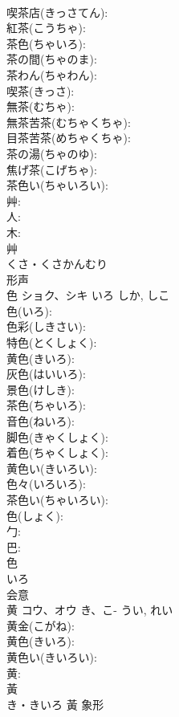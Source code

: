 \documentclass[8pt]{extreport}
\begin{document}
\begin{CJK}{UTF8}{min}
\\	喫茶店(きっさてん): 
\\	紅茶(こうちゃ): 
\\	茶色(ちゃいろ): 
\\	茶の間(ちゃのま): 
\\	茶わん(ちゃわん): 
\\	喫茶(きっさ): 
\\	無茶(むちゃ): 
\\	無茶苦茶(むちゃくちゃ): 
\\	目茶苦茶(めちゃくちゃ): 
\\	茶の湯(ちゃのゆ): 
\\	焦げ茶(こげちゃ): 
\\	茶色い(ちゃいろい): 
\\	艸: 
\\	人: 
\\	木: 
\\	艸	
\\	くさ・くさかんむり	
\\	形声 
\\	色	ショク、シキ	いろ	しか, しこ	
\\	色(いろ): 
\\	色彩(しきさい): 
\\	特色(とくしょく): 
\\	黄色(きいろ): 
\\	灰色(はいいろ): 
\\	景色(けしき): 
\\	茶色(ちゃいろ): 
\\	音色(ねいろ): 
\\	脚色(きゃくしょく): 
\\	着色(ちゃくしょく): 
\\	黄色い(きいろい): 
\\	色々(いろいろ): 
\\	茶色い(ちゃいろい): 
\\	色(しょく): 
\\	勹: 
\\	巴: 
\\	色	
\\	いろ	
\\	会意 
\\	黄	コウ、オウ	き、こ-	うい, れい	
\\	黄金(こがね): 
\\	黄色(きいろ): 
\\	黄色い(きいろい): 
\\	黄: 
\\	黃	
\\	き・きいろ	黃	象形 

\end{CJK}
\end{document}
